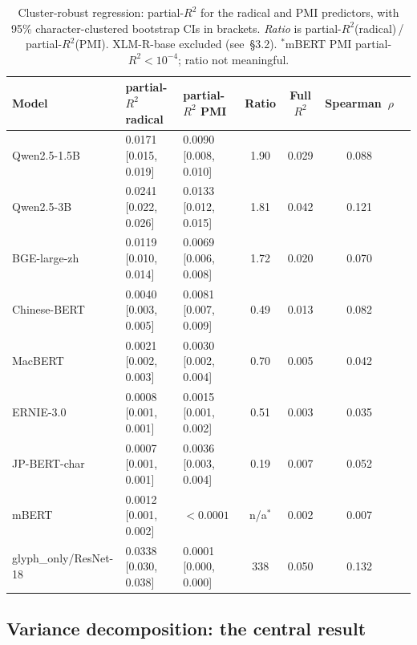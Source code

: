 \documentclass[11pt,a4paper,twocolumn]{article}
\begin{document}
\begin{table}[t!]
\centering
\caption{Cluster-robust regression: partial-$R^2$ for the radical and
PMI predictors, with 95\% character-clustered bootstrap CIs in
brackets. \emph{Ratio} is partial-$R^2$(radical)\,/\,partial-$R^2$(PMI).
XLM-R-base excluded (see~\S3.2).
$^{*}$mBERT PMI partial-$R^2 < 10^{-4}$; ratio not meaningful.}
\label{tab:variance}
\small
\setlength{\tabcolsep}{6pt}
\begin{tabular}{lllcccc}
\toprule
\textbf{Model} & \textbf{partial-$R^2$ radical} & \textbf{partial-$R^2$ PMI} & \textbf{Ratio} & \textbf{Full $R^2$} & \textbf{Spearman~$\rho$} \\
\midrule
Qwen2.5-1.5B          & 0.0171 \scriptsize[0.015,\,0.019] & 0.0090 \scriptsize[0.008,\,0.010] & 1.90 & 0.029 & 0.088 \\
Qwen2.5-3B            & 0.0241 \scriptsize[0.022,\,0.026] & 0.0133 \scriptsize[0.012,\,0.015] & 1.81 & 0.042 & 0.121 \\
BGE-large-zh          & 0.0119 \scriptsize[0.010,\,0.014] & 0.0069 \scriptsize[0.006,\,0.008] & 1.72 & 0.020 & 0.070 \\
Chinese-BERT          & 0.0040 \scriptsize[0.003,\,0.005] & 0.0081 \scriptsize[0.007,\,0.009] & 0.49 & 0.013 & 0.082 \\
MacBERT               & 0.0021 \scriptsize[0.002,\,0.003] & 0.0030 \scriptsize[0.002,\,0.004] & 0.70 & 0.005 & 0.042 \\
ERNIE-3.0             & 0.0008 \scriptsize[0.001,\,0.001] & 0.0015 \scriptsize[0.001,\,0.002] & 0.51 & 0.003 & 0.035 \\
JP-BERT-char          & 0.0007 \scriptsize[0.001,\,0.001] & 0.0036 \scriptsize[0.003,\,0.004] & 0.19 & 0.007 & 0.052 \\
mBERT                 & 0.0012 \scriptsize[0.001,\,0.002] & $<\!0.0001$                       & n/a$^{*}$ & 0.002 & 0.007 \\
glyph\_only/ResNet-18 & 0.0338 \scriptsize[0.030,\,0.038] & 0.0001 \scriptsize[0.000,\,0.000] & 338  & 0.050 & 0.132 \\
\bottomrule
\end{tabular}
\end{table}

\subsection{Variance decomposition: the central result}
\end{document}
